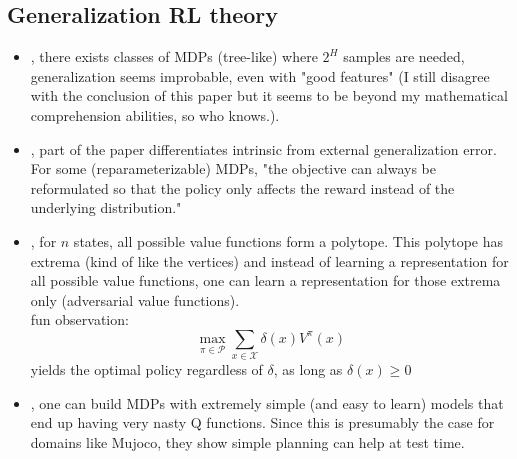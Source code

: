 \subsection{Generalization RL theory}
\begin{itemize}
    \item \cite{du2019good}, there exists classes of MDPs (tree-like) where $2^H$ samples are needed, generalization seems improbable, even with "good features" (I still disagree with the conclusion of this paper but it seems to be beyond my mathematical comprehension abilities, so who knows.).
    \item \cite{wang2019generalization}, part of the paper differentiates intrinsic from external generalization error. For some (reparameterizable) MDPs, "the objective can always be reformulated so that the policy only affects the reward instead of the underlying distribution."
    \item \cite{bellemare2019geometric}, for $n$ states, all possible value functions form a polytope. This polytope has extrema (kind of like the vertices) and instead of learning a representation for all possible value functions, one can learn a representation for those extrema only (adversarial value functions).\\
    fun observation:
    $$\max_{\pi\in\mathcal{P}} \sum_{x \in \mathcal{X}}\delta(x) V^\pi(x)$$
    yields the optimal policy regardless of $\delta$, as long as $\delta(x)\geq 0$ \cite{bertsekas2012dynamic}
    \item \citet{dong2019expressivity}, one can build MDPs with extremely simple (and easy to learn) models that end up having very nasty Q functions. Since this is presumably the case for domains like Mujoco, they show simple planning can help at test time.
\end{itemize}


